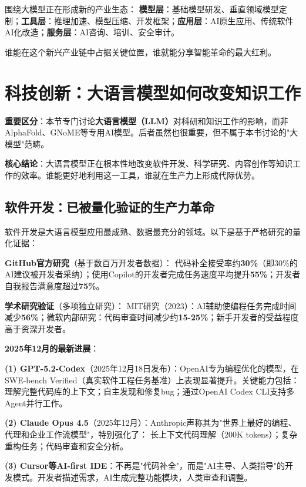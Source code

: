 围绕大模型正在形成新的产业生态：
\textbf{模型层}：基础模型研发、垂直领域模型定制；\textbf{工具层}：推理加速、模型压缩、开发框架；\textbf{应用层}：AI原生应用、传统软件AI化改造；\textbf{服务层}：AI咨询、培训、安全审计。

谁能在这个新兴产业链中占据关键位置，谁就能分享智能革命的最大红利。

\section{科技创新：大语言模型如何改变知识工作}

\textbf{重要区分}：本节专门讨论\textbf{大语言模型（LLM）}对科研和知识工作的影响，而非AlphaFold、GNoME等专用AI模型。后者虽然也很重要，但不属于本书讨论的"大模型"范畴。

\textbf{核心结论}：大语言模型正在根本性地改变软件开发、科学研究、内容创作等知识工作的效率。谁能更好地利用这一工具，谁就在生产力上形成代际优势。

\subsection{软件开发：已被量化验证的生产力革命}

软件开发是大语言模型应用最成熟、数据最充分的领域。以下是基于严格研究的量化证据：

\textbf{GitHub官方研究}（基于数百万开发者数据）：
代码补全接受率约\textbf{30\%}（即30\%的AI建议被开发者采纳）；使用Copilot的开发者完成任务速度平均提升\textbf{55\%}；开发者自我报告满意度超过\textbf{75\%}。

\textbf{学术研究验证}（多项独立研究）：
MIT研究（2023）：AI辅助使编程任务完成时间减少\textbf{56\%}；微软内部研究：代码审查时间减少约\textbf{15-25\%}；新手开发者的受益程度高于资深开发者。

\textbf{2025年12月的最新进展}：

\textbf{(1) GPT-5.2-Codex}（2025年12月18日发布）：OpenAI专为编程优化的模型，在SWE-bench Verified（真实软件工程任务基准）上表现显著提升。关键能力包括：
理解完整代码库的上下文；自主发现和修复bug；通过OpenAI Codex CLI支持多Agent并行工作。

\textbf{(2) Claude Opus 4.5}（2025年12月）：Anthropic声称其为"世界上最好的编程、代理和企业工作流模型"，特别强化了：
长上下文代码理解（200K tokens）；复杂重构任务；代码审查和安全分析。

\textbf{(3) Cursor等AI-first IDE}：不再是"代码补全"，而是"AI主导、人类指导"的开发模式。开发者描述需求，AI生成完整功能模块，人类审查和调整。

